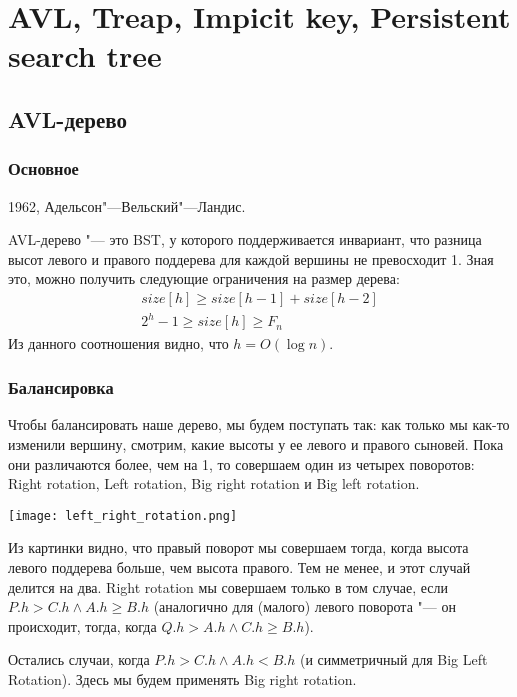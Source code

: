 \chapter{AVL, Treap, Impicit key, Persistent search tree}

\section{AVL-дерево}

\subsection{Основное}

1962, Адельсон"---Вельский"---Ландис.

AVL-дерево "--- это BST, у которого поддерживается инвариант, что разница высот левого и правого поддерева
для каждой вершины не превосходит 1.
Зная это, можно получить следующие ограничения на размер дерева:
\begin{gather*}
	size[h] \ge size[h - 1] + size[h - 2] \\
	2^h - 1 \ge size[h] \ge F_n
\end{gather*}
Из данного соотношения видно, что $h = O(\log n)$.

\subsection{Балансировка}

Чтобы балансировать наше дерево, мы будем поступать так: как только мы как-то изменили вершину, смотрим,
какие высоты у ее левого и правого сыновей.
Пока они различаются более, чем на 1, то совершаем один из четырех поворотов:
Right rotation, Left rotation, Big right rotation и Big left rotation.

\begin{center} \texttt{[image: left\_right\_rotation.png]} \end{center}

Из картинки видно, что правый поворот мы совершаем тогда, когда высота левого поддерева больше, чем высота правого.
Тем не менее, и этот случай делится на два.
Right rotation мы совершаем только в том случае, если $P.h > C.h \land A.h \ge B.h$
(аналогично для (малого) левого поворота "--- он происходит, тогда, когда $Q.h > A.h \land C.h \ge B.h$).

Остались случаи, когда $P.h > C.h \land A.h < B.h$ (и симметричный для Big Left Rotation).
Здесь мы будем применять Big right rotation.

